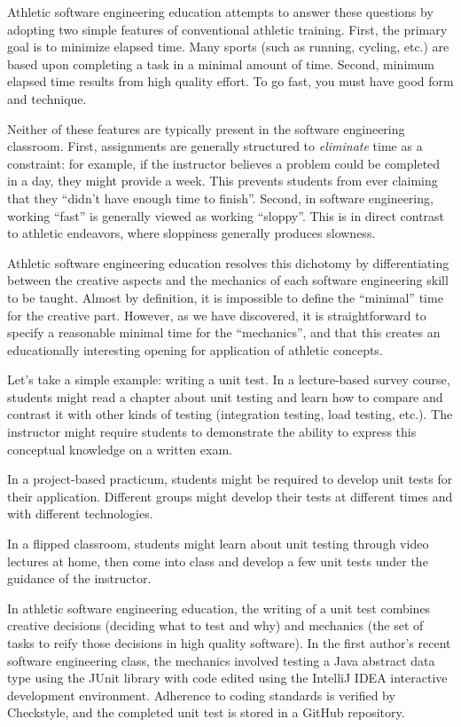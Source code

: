 Athletic software engineering education attempts to answer these questions by adopting two simple features of conventional athletic training. First, the primary goal is to minimize elapsed time.  Many sports (such as running, cycling, etc.) are based upon completing a task in a minimal amount of time.  Second, minimum elapsed time results from high quality effort. To go fast, you must have good form and technique. 

Neither of these features are typically present in the software engineering classroom. First, assignments are generally structured to {\em eliminate} time as a constraint: for example, if the instructor believes a problem could be completed in a day, they might provide a week.  This prevents students from ever claiming that they ``didn't have enough time to finish''.  Second, in software engineering, working ``fast'' is generally viewed as working ``sloppy''.  This is in direct contrast to athletic endeavors, where sloppiness generally produces slowness.

Athletic software engineering education resolves this dichotomy by differentiating between the creative aspects and the mechanics of each software engineering skill to be taught. Almost by definition, it is impossible to define the ``minimal'' time for the creative part. However, as we have discovered, it is straightforward to specify a reasonable minimal time for the ``mechanics'', and that this creates an educationally interesting opening for application of athletic concepts. 

Let's take a simple example: writing a unit test.  In a lecture-based survey course, students might read a chapter about unit testing and learn how to compare and contrast it with other kinds of testing (integration testing, load testing, etc.). The instructor might require students to demonstrate the ability to express this conceptual knowledge on a written exam.  

In a project-based practicum, students might be required to develop unit tests for their application. Different groups might develop their tests at different times and with different technologies. 

In a flipped classroom, students might learn about unit testing through video lectures at home, then come into class and develop a few unit tests under the guidance of the instructor. 

In athletic software engineering education, the writing of a unit test combines creative decisions (deciding what to test and why) and mechanics (the set of tasks to reify those decisions in high quality software).  In the first author's recent software engineering class, the mechanics involved testing a Java abstract data type using the JUnit library with code edited using the IntelliJ IDEA interactive development environment. Adherence to coding standards is verified by Checkstyle, and the completed unit test is stored in a GitHub repository. 

